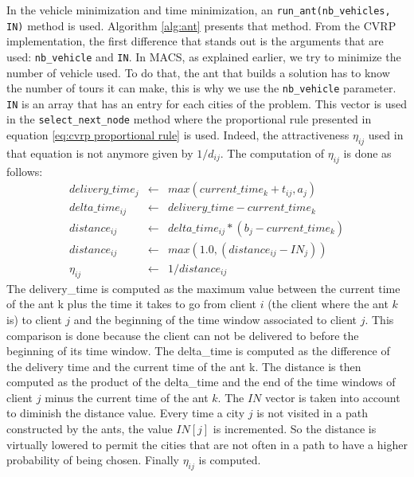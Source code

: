 In the vehicle minimization and time minimization, an \texttt{run\_ant(nb\_vehicles, IN)} method is used. Algorithm \ref{alg:ant} presents that method. From the CVRP implementation, the first difference that stands out is the arguments that are used: \texttt{nb\_vehicle} and \texttt{IN}. In MACS, as explained earlier, we try to minimize the number of vehicle used. To do that, the ant that builds a solution has to know the number of tours it can make, this is why we use the \texttt{nb\_vehicle} parameter. \texttt{IN} is an array that has an entry for each cities of the problem. This vector is used in the \texttt{select\_next\_node} method where the proportional rule presented in equation \ref{eq:cvrp proportional rule} is used. Indeed, the attractiveness $\eta_{ij}$ used in that equation is not anymore given by $1/d_{ij}$. The computation of $\eta_{ij}$ is done as follows:
\begin{eqnarray*}
	delivery\_time_j & \leftarrow & max(current\_time_k + t_{ij}, a_j)\\
	delta\_time_{ij} & \leftarrow  & delivery\_time - current\_time_k\\
	distance_{ij} & \leftarrow & delta\_time_{ij} * (b_j - current\_time_k)\\
	distance_{ij} & \leftarrow & max(1.0, (distance_{ij}-IN_j))\\
	\eta_{ij} & \leftarrow & 1/distance_{ij}
\label{eq:etavrptw}
\end{eqnarray*}
 The delivery\_time is computed as the maximum value between the current time of the ant k plus the time it takes to go from client $i$ (the client where the ant $k$ is) to client $j$ and the beginning of the time window associated to client $j$. This comparison is done because the client can not be delivered to before the beginning of its time window. The delta\_time is computed as the difference of the delivery time and the current time of the ant k. The distance is then computed as the product of the delta\_time and the end of the time windows of client $j$ minus the current time of the ant $k$. The $IN$ vector is taken into account to diminish the distance value. Every time a city $j$ is not visited in a path constructed by the ants, the value $IN[j]$ is incremented. So the distance is virtually lowered to permit the cities that are not often in a path to have a higher probability of being chosen. Finally $\eta_{ij}$ is computed.
	



